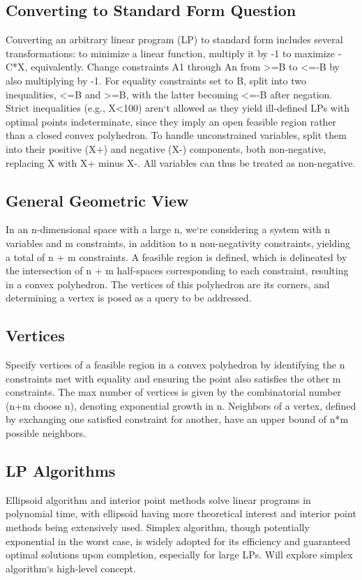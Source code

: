 \subsection*{Converting to Standard Form Question}
Converting an arbitrary linear program (LP) to standard form includes several transformations: to minimize a linear function, multiply it by -1 to maximize -C*X, equivalently.
Change constraints A1 through An from \textgreater{}=B to \textless{}=-B by also multiplying by -1.
For equality constraints set to B, split into two inequalities, \textless{}=B and \textgreater{}=B, with the latter becoming \textless{}=-B after negation.
Strict inequalities (e.g., X\textless{}100) aren`t allowed as they yield ill-defined LPs with optimal points indeterminate, since they imply an open feasible region rather than a closed convex polyhedron.
To handle unconstrained variables, split them into their positive (X+) and negative (X-) components, both non-negative, replacing X with X+ minus X-.
All variables can thus be treated as non-negative.

\subsection*{General Geometric View}
In an n-dimensional space with a large n, we`re considering a system with n variables and m constraints, in addition to n non-negativity constraints, yielding a total of n + m constraints.
A feasible region is defined, which is delineated by the intersection of n + m half-spaces corresponding to each constraint, resulting in a convex polyhedron.
The vertices of this polyhedron are its corners, and determining a vertex is posed as a query to be addressed.

\subsection*{Vertices}
Specify vertices of a feasible region in a convex polyhedron by identifying the n constraints met with equality and ensuring the point also satisfies the other m constraints.
The max number of vertices is given by the combinatorial number (n+m choose n), denoting exponential growth in n.
Neighbors of a vertex, defined by exchanging one satisfied constraint for another, have an upper bound of n*m possible neighbors.

\subsection*{LP Algorithms}
Ellipsoid algorithm and interior point methods solve linear programs in polynomial time, with ellipsoid having more theoretical interest and interior point methods being extensively used.
Simplex algorithm, though potentially exponential in the worst case, is widely adopted for its efficiency and guaranteed optimal solutions upon completion, especially for large LPs.
Will explore simplex algorithm`s high-level concept.

